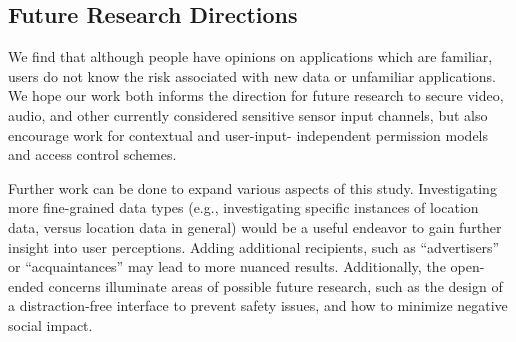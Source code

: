 \subsection{Future Research Directions}
We find that although people have opinions on applications which are familiar, users do not know the risk associated with new data or unfamiliar applications. We hope our work both informs the direction for future research to secure video, audio, and other currently considered sensitive sensor input channels, but also encourage work for contextual and user-input- independent permission models and access control schemes.

Further work can be done to expand various aspects of this study. Investigating more fine-grained data types (e.g., investigating specific instances of location data, versus location data in general) would be a useful endeavor to gain further insight into user perceptions. Adding additional recipients, such as ``advertisers'' or ``acquaintances'' may lead to more nuanced results. Additionally, the open-ended concerns illuminate areas of possible future research, such as the design of a distraction-free interface to prevent safety issues, and how to minimize negative social impact. 